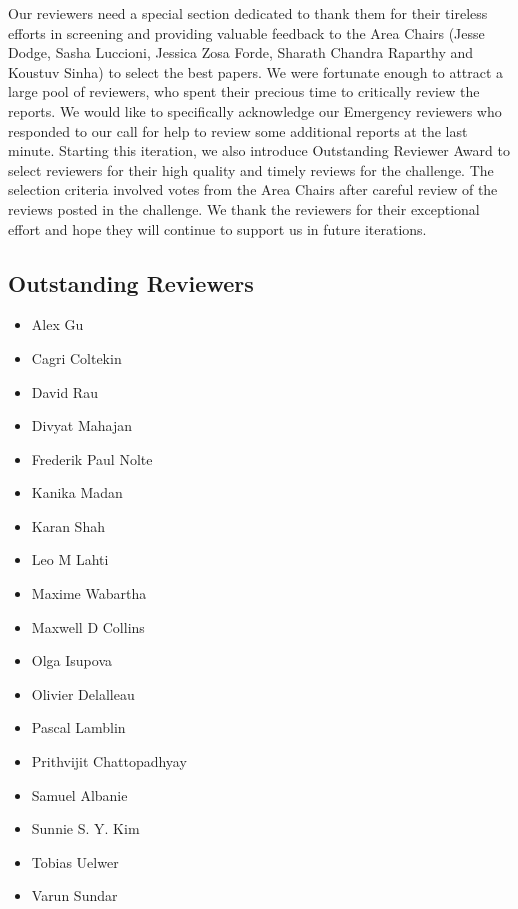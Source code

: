 Our reviewers need a special section dedicated to thank them for their tireless efforts in screening and providing valuable feedback to the Area Chairs (Jesse Dodge, Sasha Luccioni, Jessica Zosa Forde, Sharath Chandra Raparthy and Koustuv Sinha) to select the best papers. We were fortunate enough to attract a large pool of reviewers, who spent their precious time to critically review the reports. We would like to specifically acknowledge our Emergency reviewers who responded to our call for help to review some additional reports at the last minute. Starting this iteration, we also introduce Outstanding Reviewer Award to select reviewers for their high quality and timely reviews for the challenge. The selection criteria involved votes from the Area Chairs after careful review of the reviews posted in the challenge. We thank the reviewers for their exceptional effort and hope they will continue to support us in future iterations.

\subsection{Outstanding Reviewers}

\begingroup
\fontsize{8pt}{8pt}\selectfont
\begin{multicols}{3}
\begin{itemize}[label={}]
  \item Alex Gu
  \item Cagri Coltekin
  \item David Rau
  \item Divyat Mahajan
  \item Frederik Paul Nolte
  \item Kanika Madan
  \item Karan Shah
  \item Leo M Lahti
  \item Maxime Wabartha
  \item Maxwell D Collins
  \item Olga Isupova
  \item Olivier Delalleau
  \item Pascal Lamblin
  \item Prithvijit Chattopadhyay
  \item Samuel Albanie
  \item Sunnie S. Y. Kim
  \item Tobias Uelwer
  \item Varun Sundar
\end{itemize}
\end{multicols}
\endgroup


